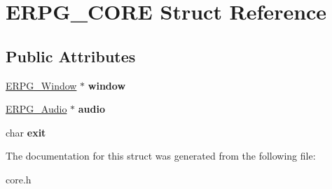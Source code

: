 \hypertarget{structERPG__CORE}{\section{E\-R\-P\-G\-\_\-\-C\-O\-R\-E Struct Reference}
\label{structERPG__CORE}
}
\subsection*{Public Attributes}
\begin{DoxyCompactItemize}
\item 
\hypertarget{structERPG__CORE_a6929409bd9322668e047b52e34ea47a4}{\hyperlink{structERPG__Window}{E\-R\-P\-G\-\_\-\-Window} $\ast$ {\bfseries window}}\label{structERPG__CORE_a6929409bd9322668e047b52e34ea47a4}

\item 
\hypertarget{structERPG__CORE_af6e0b1e497bb0a7b1bf321edcc11da8e}{\hyperlink{structERPG__Audio}{E\-R\-P\-G\-\_\-\-Audio} $\ast$ {\bfseries audio}}\label{structERPG__CORE_af6e0b1e497bb0a7b1bf321edcc11da8e}

\item 
\hypertarget{structERPG__CORE_ab6bdbfd729020362a51ffbe126f8c2aa}{char {\bfseries exit}}\label{structERPG__CORE_ab6bdbfd729020362a51ffbe126f8c2aa}

\end{DoxyCompactItemize}


The documentation for this struct was generated from the following file\-:\begin{DoxyCompactItemize}
\item 
core.\-h\end{DoxyCompactItemize}
